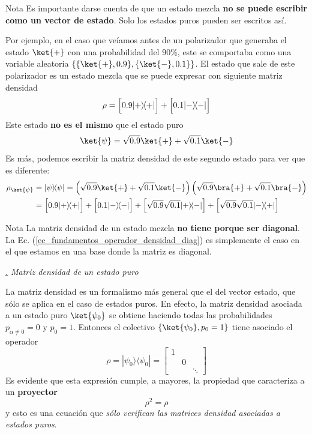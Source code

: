 \documentclass[a4paper,11pt]{book} %
\numberwithin{equation}{chapter}
\def\lp{\left(}
\def\rp{\right)}
\def\Lc{\Bigl[}
\def\Rc{\Bigr]}
\newcommand{\ketbra}[2]{| #1\rangle \! \langle #2|}
\def\subsubiContadorIt{\par\addtocounter{subsubsection}{1}\underline{\it\thesubsubsection.}\hskip0.5cm \setcounter{subsubsubsectionIt}{0}}
\newcommand{\SubsubiIt}[1]{
		\subsubiContadorIt \textit{#1}
	}
\newcounter{subsubsubsectionIt}[subsubsection]
\begin{document}
\begin{mybox_blue}{Nota}
Es importante darse cuenta de que un estado mezcla \textbf{no se puede escribir como un vector de estado}. Solo los estados puros pueden ser escritos así. 
\vspace{0.3cm}

Por ejemplo, en el caso que veíamos antes de un polarizador que generaba el estado $\ket{+}$ con una probabilidad del 90\%, este se comportaba como una variable aleatoria $ \{\{\ket{+},0.9\},\{\ket{-},0.1\}\}$. El estado que sale de este polarizador es un estado mezcla que se puede expresar con siguiente matriz densidad
	\begin{equation}
	\rho = \Lc 0.9 \ketbra{+}{+}\Rc + \Lc 0.1 \ketbra{-}{-} \Rc
	\end{equation}
Este estado \textbf{no es el mismo} que el estado puro
	\begin{equation}
	\ket{\psi} = \sqrt{0.9} \ket{+} + \sqrt{0.1} \ket{-}
	\end{equation}
Es más, podemos escribir la matriz densidad de este segundo estado para ver que es diferente:
	\begin{align}
	\rho_{\ket{\psi}} 
	& =	\ketbra{\psi}{\psi} 
	  = \lp \sqrt{0.9} \ket{+} + \sqrt{0.1} \ket{-} \rp 
		\lp \sqrt{0.9} \bra{+} + \sqrt{0.1} \bra{-} \rp \\
	& = \Lc 0.9 \ketbra{+}{+} \Rc + \Lc 0.1 \ketbra{-}{-} \Rc + \Lc \sqrt{0.9}\sqrt{0.1} \ketbra{+}{-} \Rc  + \Lc \sqrt{0.9}\sqrt{0.1} \ketbra{-}{+} \Rc
	\end{align}
\end{mybox_blue}


\begin{mybox_blue}{Nota}
La matriz densidad de un estado mezcla \textbf{no tiene porque ser diagonal}. La Ec. (\ref{ec_fundamentos_operador_densidad_diag}) es simplemente el caso en el que estamos en una base donde la matriz es diagonal.
\end{mybox_blue}

			\SubsubiIt{Matriz densidad de un estado puro}

La matriz densidad es un formalismo más general que el del vector estado, que sólo se aplica en el caso de estados puros. En efecto, la matriz densidad asociada a un estado puro $\ket{\psi_0}$ se obtiene haciendo todas las probabilidades $p_{\alpha\neq 0}=0$ y $p_{0} = 1$. Entonces el colectivo $\{\ket{\psi_0},p_0=1\}$ tiene asociado el operador
	\begin{equation}
	\rho = \ketbra{\psi_0}{\psi_0} = \begin{bmatrix}1 &  & \\ & 0 & \\ & & \ddots  \end{bmatrix}
	\end{equation}
Es evidente que esta expresión cumple, a mayores, la propiedad que caracteriza a un \textbf{proyector}
	\begin{equation}
	\rho^2 = \rho
	\end{equation}
y esto es una ecuación que \textit{sólo verifican las matrices densidad asociadas a estados puros}.
\end{document}
